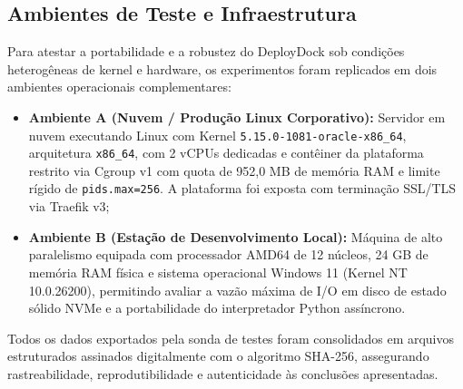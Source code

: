 \subsection{Ambientes de Teste e Infraestrutura}
\label{sec:ambientes-teste}

Para atestar a portabilidade e a robustez do DeployDock sob condições heterogêneas de kernel e hardware, os experimentos foram replicados em dois ambientes operacionais complementares:

\begin{itemize}
    \item \textbf{Ambiente A (Nuvem / Produção Linux Corporativo):} Servidor em nuvem executando Linux com Kernel \texttt{5.15.0-1081-oracle-x86\_64}, arquitetura \texttt{x86\_64}, com 2 vCPUs dedicadas e contêiner da plataforma restrito via Cgroup v1 com quota de 952,0 MB de memória RAM e limite rígido de \texttt{pids.max=256}. A plataforma foi exposta com terminação SSL/TLS via Traefik v3;
    \item \textbf{Ambiente B (Estação de Desenvolvimento Local):} Máquina de alto paralelismo equipada com processador AMD64 de 12 núcleos, 24 GB de memória RAM física e sistema operacional Windows 11 (Kernel NT 10.0.26200), permitindo avaliar a vazão máxima de I/O em disco de estado sólido NVMe e a portabilidade do interpretador Python assíncrono.
\end{itemize}

Todos os dados exportados pela sonda de testes foram consolidados em arquivos estruturados assinados digitalmente com o algoritmo SHA-256, assegurando rastreabilidade, reprodutibilidade e autenticidade às conclusões apresentadas.
